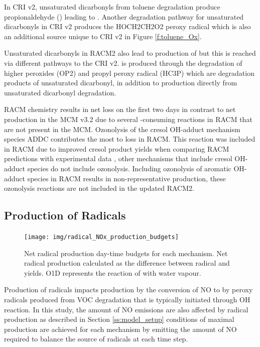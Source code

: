 In CRI v2, unsaturated dicarbonyls from toluene degradation produce propionaldehyde () leading to .
Another degradation pathway for unsaturated dicarbonyls in CRI v2 produces the HOCH2CH2O2 peroxy radical which is also an additional  source unique to CRI v2 in Figure \ref{f:toluene_Ox}.

Unsaturated dicarbonyls in RACM2 also lead to production of  but this is reached via different pathways to the CRI v2.
 is produced through the degradation of higher peroxides (OP2) and propyl peroxy radical (HC3P) which are degradation products of unsaturated dicarbonyl, in addition to  production directly from unsaturated dicarbonyl degradation.

RACM chemistry results in net  loss on the first two days in contrast to net  production in the MCM v3.2 due to several -consuming reactions in RACM that are not present in the MCM.
Ozonolysis of the cresol OH-adduct mechanism species ADDC contributes the most to  loss in RACM.
This reaction was included in RACM due to improved cresol product yields when comparing RACM predictions with experimental data \citep{Stockwell:1997}, other mechanisms that include cresol OH-adduct species do not include ozonolysis.
Including ozonolysis of aromatic OH-adduct species in RACM results in non-representative  production, these ozonolysis reactions are not included in the updated RACM2.

\subsection{Production of Radicals} \label{ss:radicals}

\begin{figure}
    \centering
    \texttt{[image: img/radical\_NOx\_production\_budgets]}
    \vspace{0mm}
    \caption{Net radical production day-time budgets for each mechanism. Net radical production calculated as the difference between radical and  yields. O1D represents the reaction of  with water vapour.}
    \vspace{-4mm}
    \label{f:radical_production} 
\end{figure} 

Production of radicals impacts  production by the conversion of NO to  by peroxy radicals produced from VOC degradation that is typically initiated through OH reaction.
In this study, the amount of NO emissions are also affected by radical production as described in Section \ref{ss:model_setup} conditions of maximal  production are achieved for each mechanism by emitting the amount of NO required to balance the source of radicals at each time step. 

